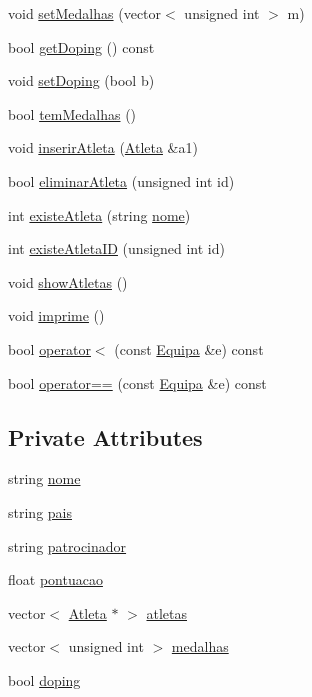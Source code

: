 \begin{DoxyCompactItemize}
void \hyperlink{class_equipa_a55fd939cdd5081a4221a4a3c643baf9a}{set\+Medalhas} (vector$<$ unsigned int $>$ m)
\item 
bool \hyperlink{class_equipa_a6558412092e6530d761d629cbe9c40a3}{get\+Doping} () const 
\item 
void \hyperlink{class_equipa_a13920c918f0a76970f077df3ed0267df}{set\+Doping} (bool b)
\item 
bool \hyperlink{class_equipa_a403ac4545ec90aee0f24e0af59f7f969}{tem\+Medalhas} ()
\item 
void \hyperlink{class_equipa_a67f982e822a7772f2668301db0e147eb}{inserir\+Atleta} (\hyperlink{class_atleta}{Atleta} \&a1)
\item 
bool \hyperlink{class_equipa_a12d4f1b639138a62482483e730f1c85f}{eliminar\+Atleta} (unsigned int id)
\item 
int \hyperlink{class_equipa_a9ad2d95727dfd39cf788e5c5a49b03d9}{existe\+Atleta} (string \hyperlink{class_equipa_a8373ab9d0fe95ae0c231bf2d9707e759}{nome})
\item 
int \hyperlink{class_equipa_ade9df7fbce5c76b859cb15331f7d38b9}{existe\+Atleta\+I\+D} (unsigned int id)
\item 
void \hyperlink{class_equipa_ab17ae44fbe5b5dd2d7eea4a6d752f518}{show\+Atletas} ()
\item 
void \hyperlink{class_equipa_a1329201fd3f78cf3b7c9c146578af92f}{imprime} ()
\item 
bool \hyperlink{class_equipa_afec282eb4594c7decdff4e1ee6ce1082}{operator$<$} (const \hyperlink{class_equipa}{Equipa} \&e) const 
\item 
bool \hyperlink{class_equipa_a8eec4d0cdd5d10cb0d8ede684710207a}{operator==} (const \hyperlink{class_equipa}{Equipa} \&e) const 
\end{DoxyCompactItemize}
\subsection*{Private Attributes}
\begin{DoxyCompactItemize}
\item 
string \hyperlink{class_equipa_a8373ab9d0fe95ae0c231bf2d9707e759}{nome}
\item 
string \hyperlink{class_equipa_a9972aebf308a7adcd5e23d127639311f}{pais}
\item 
string \hyperlink{class_equipa_ac9a1c45750e118888d61930c3bf4d185}{patrocinador}
\item 
float \hyperlink{class_equipa_a1b047e8ef3d73dd54b656af9dbfcf9ae}{pontuacao}
\item 
vector$<$ \hyperlink{class_atleta}{Atleta} $\ast$ $>$ \hyperlink{class_equipa_a391f6bca285bedd992f0104a17b79719}{atletas}
\item 
vector$<$ unsigned int $>$ \hyperlink{class_equipa_a80660d68792c53872f69973bfea0a5f4}{medalhas}
\item 
bool \hyperlink{class_equipa_a3fa99ed0ff8e3be35194d6c3061beb34}{doping}
\end{DoxyCompactItemize}



